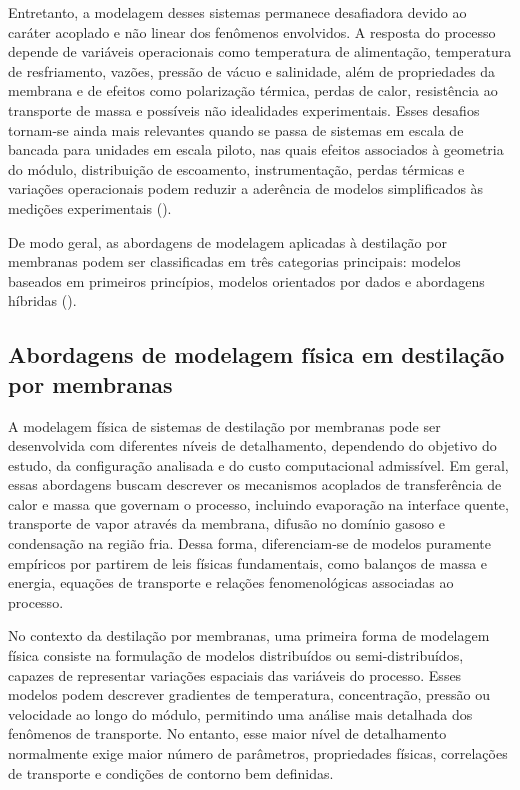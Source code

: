 Entretanto, a modelagem desses sistemas permanece desafiadora devido ao caráter acoplado e não linear dos fenômenos envolvidos. A resposta do processo depende de variáveis operacionais como temperatura de alimentação, temperatura de resfriamento, vazões, pressão de vácuo e salinidade, além de propriedades da membrana e de efeitos como polarização térmica, perdas de calor, resistência ao transporte de massa e possíveis não idealidades experimentais. Esses desafios tornam-se ainda mais relevantes quando se passa de sistemas em escala de bancada para unidades em escala piloto, nas quais efeitos associados à geometria do módulo, distribuição de escoamento, instrumentação, perdas térmicas e variações operacionais podem reduzir a aderência de modelos simplificados às medições experimentais (\cite{Lisboa2024}).

De modo geral, as abordagens de modelagem aplicadas à destilação por membranas podem ser classificadas em três categorias principais: modelos baseados em primeiros princípios, modelos orientados por dados e abordagens híbridas (\cite{ReviewAI_MD}).

\subsection{Abordagens de modelagem física em destilação por membranas}

A modelagem física de sistemas de destilação por membranas pode ser desenvolvida com diferentes níveis de detalhamento, dependendo do objetivo do estudo, da configuração analisada e do custo computacional admissível. Em geral, essas abordagens buscam descrever os mecanismos acoplados de transferência de calor e massa que governam o processo, incluindo evaporação na interface quente, transporte de vapor através da membrana, difusão no domínio gasoso e condensação na região fria. Dessa forma, diferenciam-se de modelos puramente empíricos por partirem de leis físicas fundamentais, como balanços de massa e energia, equações de transporte e relações fenomenológicas associadas ao processo.

No contexto da destilação por membranas, uma primeira forma de modelagem física consiste na formulação de modelos distribuídos ou semi-distribuídos, capazes de representar variações espaciais das variáveis do processo. Esses modelos podem descrever gradientes de temperatura, concentração, pressão ou velocidade ao longo do módulo, permitindo uma análise mais detalhada dos fenômenos de transporte. No entanto, esse maior nível de detalhamento normalmente exige maior número de parâmetros, propriedades físicas, correlações de transporte e condições de contorno bem definidas.

